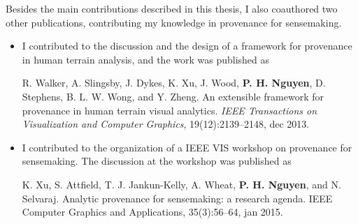 
Besides the main contributions described in this thesis, I also coauthored two other publications, contributing my knowledge in provenance for sensemaking.

\begin{itemize}
	\item I contributed to the discussion and the design of a framework for provenance in human terrain analysis, and the work was published as
	
	R. Walker, A. Slingsby, J. Dykes, K. Xu, J. Wood, \textbf{P. H. Nguyen}, D. Stephens, B. L. W. Wong, and Y. Zheng. An extensible framework for provenance in human terrain visual analytics. \textit{IEEE Transactions on Visualization and Computer Graphics}, 19(12):2139--2148, dec 2013.
	
	\item I contributed to the organization of a IEEE VIS workshop on provenance for sensemaking. The discussion at the workshop was published as
	
	K. Xu, S. Attfield, T. J. Jankun-Kelly, A. Wheat, \textbf{P. H. Nguyen}, and N. Selvaraj. Analytic provenance for sensemaking: a research agenda. IEEE Computer Graphics and Applications, 35(3):56--64, jan 2015.
	
\end{itemize}


